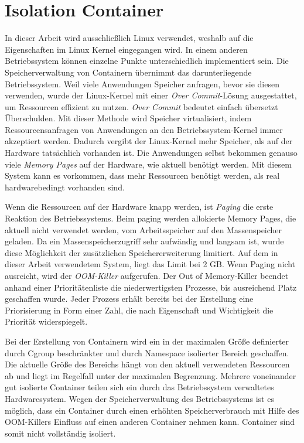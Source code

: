 \thispagestyle{empty}
\section{Isolation Container}
\label{Isolation Container}

In dieser Arbeit wird ausschließlich Linux verwendet, weshalb auf die Eigenschaften im Linux Kernel eingegangen wird. In einem anderen Betriebssystem können einzelne Punkte unterschiedlich implementiert sein. Die Speicherverwaltung von Containern übernimmt das darunterliegende Betriebssystem. Weil viele Anwendungen Speicher anfragen, bevor sie diesen verwenden, wurde der Linux-Kernel mit einer \emph{Over Commit}-Lösung ausgestattet, um Ressourcen effizient zu nutzen. \emph{Over Commit} bedeutet einfach übersetzt Überschulden. Mit dieser Methode wird Speicher virtualisiert, indem Ressourcensanfragen von Anwendungen an den Betriebssystem-Kernel immer akzeptiert werden. Dadurch vergibt der Linux-Kernel mehr Speicher, als auf der Hardware tatsächlich vorhanden ist. Die Anwendungen selbst bekommen genauso viele \emph{Memory Pages} auf der Hardware, wie aktuell benötigt werden. Mit diesem System kann es vorkommen, dass mehr Ressourcen benötigt werden, als real hardwarebedingt vorhanden sind. 

Wenn die Ressourcen auf der Hardware knapp werden, ist \emph{Paging} die erste Reaktion des Betriebssystems. Beim paging werden allokierte Memory Pages, die aktuell nicht verwendet werden, vom Arbeitsspeicher auf den Massenspeicher geladen. Da ein Massenspeicherzugriff sehr aufwändig und langsam ist, wurde diese Möglichkeit der zusätzlichen Speichererweiterung limitiert. Auf dem in dieser Arbeit verwendetem System, liegt das Limit bei 2 GB. Wenn Paging nicht ausreicht, wird der \emph{OOM-Killer} aufgerufen. Der Out of Memory-Killer beendet anhand einer Prioritätenliste die niederwertigsten Prozesse, bis ausreichend Platz geschaffen wurde. Jeder Prozess erhält bereits bei der Erstellung eine Priorisierung in Form einer Zahl, die nach Eigenschaft und Wichtigkeit die Priorität widerspiegelt.

Bei der Erstellung von Containern wird ein in der maximalen Größe definierter durch Cgroup beschränkter und durch Namespace isolierter Bereich geschaffen. Die aktuelle Größe des Bereichs hängt von den aktuell verwendeten Ressourcen ab und liegt im Regelfall unter der maximalen Begrenzung. Mehrere voneinander gut isolierte Container teilen sich ein durch das Betriebssystem verwaltetes Hardwaresystem. Wegen der Speicherverwaltung des Betriebssystems ist es möglich, dass ein Container durch einen erhöhten Speicherverbrauch mit Hilfe des OOM-Killers Einfluss auf einen anderen Container nehmen kann. Container sind somit nicht vollständig isoliert.

